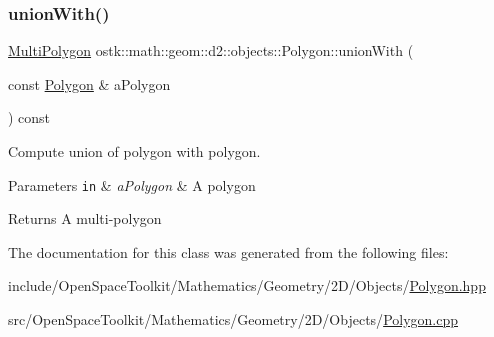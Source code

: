 \subsubsection{\texorpdfstring{union\+With()}{unionWith()}}
{\footnotesize\ttfamily \hyperlink{classostk_1_1math_1_1geom_1_1d2_1_1objects_1_1_multi_polygon}{Multi\+Polygon} ostk\+::math\+::geom\+::d2\+::objects\+::\+Polygon\+::union\+With (\begin{DoxyParamCaption}\item[{const \hyperlink{classostk_1_1math_1_1geom_1_1d2_1_1objects_1_1_polygon}{Polygon} \&}]{a\+Polygon }\end{DoxyParamCaption}) const}



Compute union of polygon with polygon. 


\begin{DoxyParams}[1]{Parameters}
\mbox{\tt in}  & {\em a\+Polygon} & A polygon \\
\hline
\end{DoxyParams}
\begin{DoxyReturn}{Returns}
A multi-\/polygon 
\end{DoxyReturn}


The documentation for this class was generated from the following files\+:\begin{DoxyCompactItemize}
\item 
include/\+Open\+Space\+Toolkit/\+Mathematics/\+Geometry/2\+D/\+Objects/\hyperlink{2_d_2_objects_2_polygon_8hpp}{Polygon.\+hpp}\item 
src/\+Open\+Space\+Toolkit/\+Mathematics/\+Geometry/2\+D/\+Objects/\hyperlink{2_d_2_objects_2_polygon_8cpp}{Polygon.\+cpp}\end{DoxyCompactItemize}
